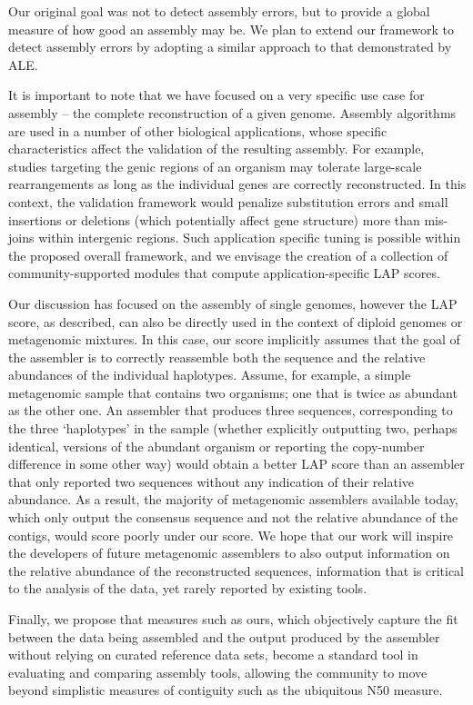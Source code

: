 \documentclass[12pt,\mydriver]{thesis}
\begin{document}
Our original goal was not to detect assembly errors, but to provide a global measure of how good an assembly may be.
We plan to extend our framework to detect assembly errors by adopting a similar approach to that demonstrated by ALE.

It is important to note that we have focused on a very specific use
case for assembly -- the complete reconstruction of a given genome.
Assembly algorithms are used in a number of other biological
applications, whose specific characteristics affect the validation of
the resulting assembly.  For example, studies targeting the genic
regions of an organism may tolerate large-scale rearrangements as long
as the individual genes are correctly reconstructed. In this context,
the validation framework would penalize substitution errors and small
insertions or deletions (which potentially affect gene structure) more
than mis-joins within intergenic regions.  Such application specific
tuning is possible within the proposed overall framework, and we
envisage the creation of a collection of community-supported modules
that compute application-specific LAP scores.

Our discussion has focused on the assembly of single genomes, however
the LAP score, as described, can also be directly used in the context
of diploid genomes or metagenomic mixtures.  In this case, our
score implicitly assumes that the goal of the assembler is to
correctly reassemble both the sequence and the relative abundances of the
individual haplotypes.  Assume, for example, a simple metagenomic
sample that contains two organisms; one that is twice as abundant as
the other one.  An assembler that produces three sequences,
corresponding to the three `haplotypes' in the sample (whether
explicitly outputting two, perhaps identical, versions of the abundant
organism or reporting the copy-number difference in some other way)
would obtain a better LAP score than an assembler that only reported
two sequences without any indication of their relative abundance. As
a result, the majority of metagenomic assemblers available today,
which only output the consensus sequence and not the relative
abundance of the contigs, would score poorly under our score.  We hope
that our work will inspire the developers of future metagenomic
assemblers to also output information on the relative abundance of the
reconstructed sequences, information that is critical to the analysis
of the data, yet rarely reported by existing tools.

Finally, we propose that measures such as ours, which objectively
capture the fit between the data being assembled and the output
produced by the assembler without relying on curated reference data
sets, become a standard tool in evaluating and comparing assembly
tools, allowing the community to move beyond simplistic measures of
contiguity such as the ubiquitous N50 measure.
\end{document}
